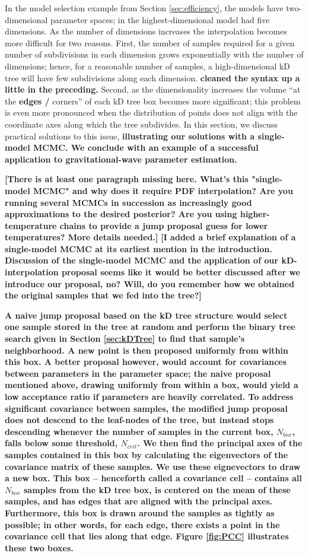 \documentclass{iopart}
\newcommand{\ilya}[1]{{\color{red} \bf #1}}
\newcommand{\dan}[1]{{\color{magenta} \bf #1}}
\begin{document}
In the model selection example from Section \ref{sec:efficiency}, the
models have two-dimensional parameter spaces; in \cite{Farr2010} the
highest-dimensional model had five dimensions.  As the number of
dimensions increases the interpolation becomes more difficult for two
reasons.  First, the number of samples required for a given
number of subdivisions in each dimension grows exponentially with
the number of dimensions; hence, for a reasonable number of samples, a high-dimensional kD tree will have few subdivisions along each dimension. \dan{cleaned the syntax up a little in the preceding.} Second, as
the dimensionality increases the volume ``at the \ilya{edges /} corners'' of each kD
tree box becomes more significant; this problem is even more
pronounced when the distribution of points does not align with the
coordinate axes along which the tree subdivides.  In this section, we
discuss practical solutions to this issue, \dan{illustrating our solutions with a single-model MCMC. We conclude with an example of a successful
application to gravitational-wave parameter estimation.}

\ilya{[There is at least one paragraph missing here.  What's this "single-model MCMC" and why does it require PDF interpolation?  Are you running several MCMCs in succession as increasingly good approximations to the desired posterior?  Are you using higher-temperature chains to provide a jump proposal guess for lower temperatures?   More details needed.]} \dan{[I added a brief explanation of a single-model MCMC at its earliest mention in the introduction. Discussion of the single-model MCMC and the application of our kD-interpolation proposal seems like it would be better discussed after we introduce our proposal, no? Will, do you remember how we obtained the original samples that we fed into the tree?]}

\dan{A naive jump proposal based on the kD tree structure would select one sample stored in the tree at random and perform the binary tree search given in Section \ref{sec:kDTree} to find that sample's neighborhood. A new point is then proposed uniformly from within this box. A better proposal however, would account for covariances between parameters in the parameter space; the naive proposal mentioned above, drawing uniformly from within a box, would yield a low acceptance ratio if parameters are heavily correlated. To address significant covariance between samples, the modified jump proposal does not descend to the leaf-nodes of the tree, but instead stops descending whenever the number of samples in the current box, $N_{box}$, falls below some threshold, $N_{crit}$. We then find the principal axes of the samples
contained in this box by calculating the eigenvectors of the covariance matrix of these samples. We use these eignevectors to draw a new box. This box -- henceforth called a covariance cell -- contains all $N_{box}$ samples from the kD tree box, is centered on the mean of these samples, and has edges that are aligned with the principal axes. Furthermore, this box is drawn around the samples as tightly as possible; in other words, for each edge, there exists a point in the covariance cell that lies along that edge. Figure
\ref{fig:PCC} illustrates these two boxes.}
\end{document}
